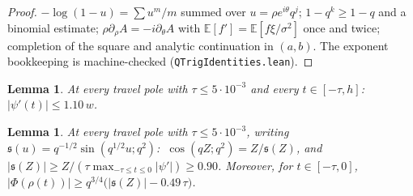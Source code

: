 \documentclass[11pt]{article}
\theoremstyle{plain}
\newtheorem{lemma}[theorem]{Lemma}
\theoremstyle{definition}
\theoremstyle{remark}
\begin{document}
\begin{proof}
$-\log(1-u)=\sum u^m/m$ summed over $u=\rho e^{i\theta}q^j$; $1-q^k\ge1-q$ and a binomial estimate;
$\rho\partial_\rho A=-i\partial_\theta A$ with $\mathbb{E}[f']=\mathbb{E}[f\xi/\sigma^2]$ once and twice; completion of
the square and analytic continuation in $(a,b)$. The exponent bookkeeping is machine-checked
(\texttt{QTrigIdentities.lean}).
\end{proof}

\begin{lemma}\label{app:psi1}
At every travel pole with $\tau\le5\cdot10^{-3}$ and every $t\in[-\tau,h]$:
$|\psi'(t)|\le1.10\,w$.
\end{lemma}

\begin{lemma}\label{app:sZ}
At every travel pole with $\tau\le5\cdot10^{-3}$, writing
$\mathfrak s(u)=q^{-1/2}\sin(q^{1/2}u;q^2)$: $\ \cos(qZ;q^2)=Z/\mathfrak s(Z)$, and
$|\mathfrak s(Z)|\ge Z/(\tau\max_{-\tau\le t\le0}|\psi'|)\ge0.90$. Moreover, for $t\in[-\tau,0]$,
$|\Phi(\rho(t))|\ge q^{3/4}\bigl(|\mathfrak s(Z)|-0.49\,\tau\bigr)$.
\end{lemma}
\end{document}
